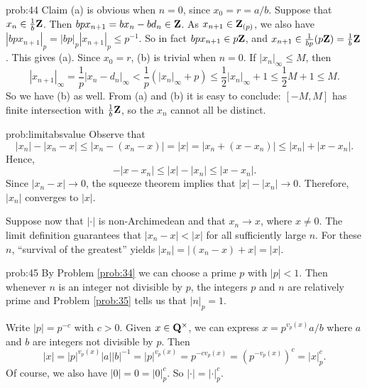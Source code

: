 \begin{sol}{prob:44}
Claim (a) is obvious when $n=0$, since $x_0 = r= a/b$. Suppose that $x_n\in \frac{1}{b}\mathbf{Z}$. Then $b p x_{n+1} = bx_n - b d_n \in \mathbf{Z}$. As $x_{n+1} \in \mathbf{Z}_{(p)}$, we also have $|bp x_{n+1}|_p = |bp|_p |x_{n+1}|_{p} \le p^{-1}$. So in fact $bp x_{n+1} \in p\mathbf{Z}$, and $x_{n+1} \in \frac{1}{bp} (p\mathbf{Z}) = \frac{1}{b}\mathbf{Z}$. This gives (a). Since $x_0=r$, (b) is trivial when $n=0$. If $|x_n|_{\infty} \le M$, then \[ |x_{n+1}|_{\infty} = \frac{1}{p} |x_{n} - d_n|_{\infty} < \frac{1}{p} (|x_n|_{\infty} + p) \le \frac{1}{2}|x_n|_{\infty} + 1 \le \frac{1}{2} M + 1 \le M. \] 
So we have (b) as well. From (a) and (b) it is easy to conclude: $[-M, M]$ has finite intersection with $\frac{1}{b}\mathbf{Z}$, so the $x_n$ cannot all be distinct.
\end{sol}

\begin{sol}{prob:limitabsvalue} Observe that 
\[ |x_n|- |x_n-x| \le |x_n-(x_n-x)| = |x| = |x_n+(x-x_n)| \le |x_n| + |x-x_n|. \]
Hence, 
\[ -|x-x_n| \le |x|-|x_n| \le |x-x_n|. \]
Since $|x_n-x|\to 0$, the squeeze theorem implies that $|x| -|x_n| \to 0$. Therefore, $|x_n|$ converges to $|x|$.

Suppose now that $|\cdot|$ is non-Archimedean and that $x_n\to x$, where $x\ne 0$. The limit definition guarantees that $|x_n-x| < |x|$ for all sufficiently large $n$. For these $n$, ``survival of the greatest'' yields $|x_n| = |(x_n-x)+x| = |x|$.
\end{sol}

\begin{sol}{prob:45} By Problem \ref{prob:34} we can choose a prime $p$ with $|p|< 1$. Then whenever $n$ is an integer not divisible by $p$, the integers $p$ and $n$ are relatively prime and  Problem \ref{prob:35} tells us that $|n|_p=1$. 

Write $|p|= p^{-c}$ with $c> 0$. Given $x \in \mathbf{Q}^{\times}$, we can express $x=p^{v_p(x)} a/b$ where $a$ and $b$ are integers not divisible by $p$. Then 
\[ |x| = |p|^{v_p(x)} |a| |b|^{-1} = |p|^{v_p(x)} = p^{-c v_p(x)} = (p^{-v_p(x)})^{c} = |x|_p^{c}. \]
Of course, we also have $|0| = 0 = |0|_p^c$. So $|\cdot| = |\cdot|_p^{c}$.
\end{sol}

